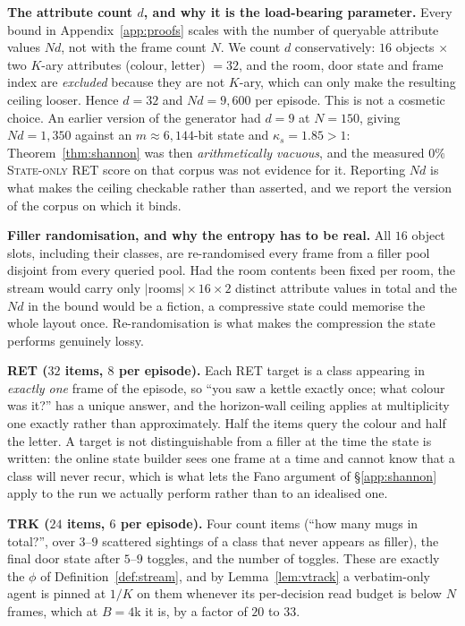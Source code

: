 \documentclass[10pt]{article}
\theoremstyle{definition}
\theoremstyle{plain}
\begin{document}
\textbf{The attribute count $d$, and why it is the load-bearing parameter.} Every bound in Appendix~\ref{app:proofs} scales with the number of queryable attribute values $Nd$, not with the frame count $N$. We count $d$ conservatively: $16$ objects $\times$ two $K$-ary attributes (colour, letter) $=32$, and the room, door state and frame index are \emph{excluded} because they are not $K$-ary, which can only make the resulting ceiling looser. Hence $d{=}32$ and $Nd{=}9{,}600$ per episode. This is not a cosmetic choice. An earlier version of the generator had $d{=}9$ at $N{=}150$, giving $Nd{=}1{,}350$ against an $m\approx6{,}144$-bit state and $\kappa_s{=}1.85>1$: Theorem~\ref{thm:shannon} was then \emph{arithmetically vacuous}, and the measured $0\%$ \textsc{State-only} RET score on that corpus was not evidence for it. Reporting $Nd$ is what makes the ceiling checkable rather than asserted, and we report the version of the corpus on which it binds.

\textbf{Filler randomisation, and why the entropy has to be real.} All $16$ object slots, including their classes, are re-randomised every frame from a filler pool disjoint from every queried pool. Had the room contents been fixed per room, the stream would carry only $|\mathrm{rooms}|\times16\times2$ distinct attribute values in total and the $Nd$ in the bound would be a fiction, a compressive state could memorise the whole layout once. Re-randomisation is what makes the compression the state performs genuinely lossy.

\textbf{RET ($32$ items, $8$ per episode).} Each RET target is a class appearing in \emph{exactly one} frame of the episode, so ``you saw a kettle exactly once; what colour was it?'' has a unique answer, and the horizon-wall ceiling applies at multiplicity one exactly rather than approximately. Half the items query the colour and half the letter. A target is not distinguishable from a filler at the time the state is written: the online state builder sees one frame at a time and cannot know that a class will never recur, which is what lets the Fano argument of \S\ref{app:shannon} apply to the run we actually perform rather than to an idealised one.

\textbf{TRK ($24$ items, $6$ per episode).} Four count items (``how many mugs in total?'', over $3$--$9$ scattered sightings of a class that never appears as filler), the final door state after $5$--$9$ toggles, and the number of toggles. These are exactly the $\phi$ of Definition~\ref{def:stream}, and by Lemma~\ref{lem:vtrack} a verbatim-only agent is pinned at $1/K$ on them whenever its per-decision read budget is below $N$ frames, which at $B{=}4$k it is, by a factor of $20$ to $33$.
\end{document}
